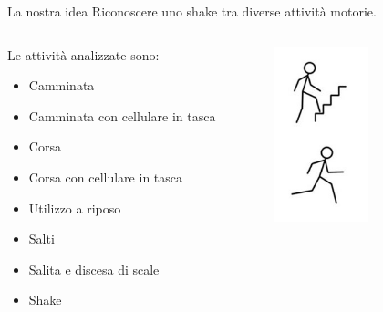 \documentclass{beamer}
\begin{document}
\begin{frame}{La nostra idea}
Riconoscere uno shake tra diverse attività motorie.\\
\smallskip
\begin{columns}[T] %
\begin{column}{.48\textwidth}
Le attività analizzate sono:
\begin{itemize}
\item Camminata
\item Camminata con cellulare in tasca
\item Corsa
\item Corsa con cellulare in tasca
\item Utilizzo a riposo
\item Salti
\item Salita e discesa di scale
\item Shake
\end{itemize}
\end{column}%
\hfill%
\begin{column}{.4\textwidth}
\begin{figure}[H]
\includegraphics[width=0.6\textwidth]{./images/attivit.jpg}
\end{figure}
\end{column}%
\end{columns}
\end{frame}
\end{document}
